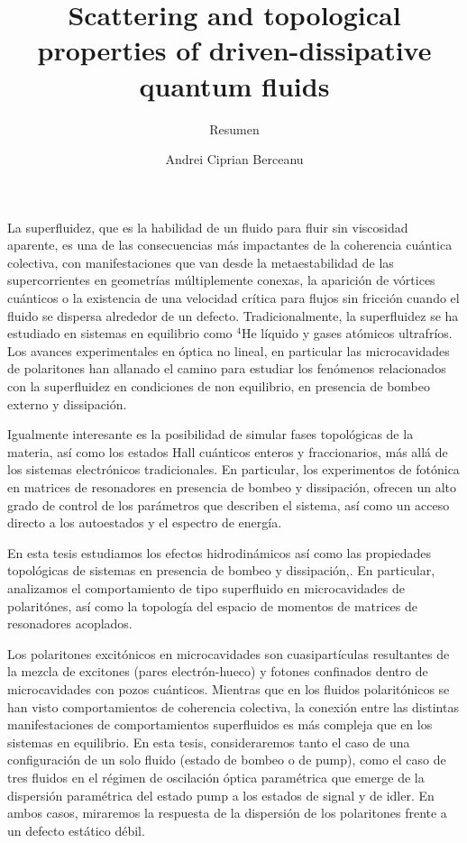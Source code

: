 \documentclass{scrartcl}
\title{Scattering and topological properties of driven-dissipative quantum fluids}
\subtitle{Resumen}
\author{Andrei Ciprian Berceanu}
\date{}
\begin{document}
\maketitle

La superfluidez, que es la habilidad de un fluido para fluir sin
viscosidad aparente, es una de las consecuencias m\'as impactantes de
la coherencia cu\'antica colectiva, con manifestaciones que van desde
la metaestabilidad de las supercorrientes en geometr\'ias
m\'ultiplemente conexas, la aparici\'on de v\'ortices cu\'anticos o la
existencia de una velocidad cr\'itica para flujos sin fricci\'on
cuando el fluido se dispersa alrededor de un
defecto. Tradicionalmente, la superfluidez se ha estudiado en sistemas
en equilibrio como $^4$He l\'iquido y gases at\'omicos
ultrafr\'ios. Los avances experimentales en \'optica no lineal, en
particular las microcavidades de polaritones han allanado el camino
para estudiar los fen\'omenos relacionados con la superfluidez en
condiciones de non equilibrio, en presencia de bombeo externo y
dissipaci\'on.

Igualmente interesante es la posibilidad de simular fases
topol\'ogicas de la materia, as\'i como los estados Hall cu\'anticos
enteros y fraccionarios, m\'as all\'a de los sistemas electr\'onicos
tradicionales. En particular, los experimentos de fot\'onica en
matrices de resonadores en presencia de bombeo y dissipaci\'on,
ofrecen un alto grado de control de los par\'ametros que describen el
sistema, as\'i como un acceso directo a los autoestados y el espectro
de energ\'ia.

En esta tesis estudiamos los efectos hidrodin\'amicos as\'i como las
propiedades topol\'ogicas de sistemas en presencia de bombeo y
dissipaci\'on,. En particular, analizamos el comportamiento de tipo
superfluido en microcavidades de polarit\'ones, as\'i como la
topolog\'ia del espacio de momentos de matrices de resonadores
acoplados.

Los polaritones excit\'onicos en microcavidades son cuasipart\'iculas
resultantes de la mezcla de excitones (pares electr\'on-hueco) y
fotones confinados dentro de microcavidades con pozos
cu\'anticos. Mientras que en los fluidos polarit\'onicos se han visto
comportamientos de coherencia colectiva, la conexi\'on entre las
distintas manifestaciones de comportamientos superfluidos es m\'as
compleja que en los sistemas en equilibrio. En esta tesis,
consideraremos tanto el caso de una configuraci\'on de un solo fluido
(estado de bombeo o de pump), como el caso de tres fluidos en el
r\'egimen de oscilaci\'on \'optica param\'etrica que emerge de la
dispersi\'on param\'etrica del estado pump a los estados de signal y
de idler. En ambos casos, miraremos la respuesta de la dispersi\'on de
los polaritones frente a un defecto est\'atico d\'ebil.
\end{document}
